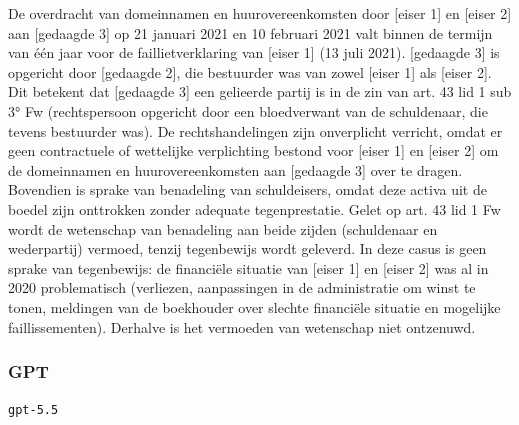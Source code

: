 \documentclass[
  dutch,
  a4paper,
]{article}
\begin{document}
De overdracht van domeinnamen en huurovereenkomsten door {[}eiser 1{]} en {[}eiser 2{]} aan {[}gedaagde 3{]} op 21 januari 2021 en 10 februari 2021 valt binnen de termijn van één jaar voor de faillietverklaring van {[}eiser 1{]} (13 juli 2021). {[}gedaagde 3{]} is opgericht door {[}gedaagde 2{]}, die bestuurder was van zowel {[}eiser 1{]} als {[}eiser 2{]}. Dit betekent dat {[}gedaagde 3{]} een gelieerde partij is in de zin van art. 43 lid 1 sub 3° Fw (rechtspersoon opgericht door een bloedverwant van de schuldenaar, die tevens bestuurder was). De rechtshandelingen zijn onverplicht verricht, omdat er geen contractuele of wettelijke verplichting bestond voor {[}eiser 1{]} en {[}eiser 2{]} om de domeinnamen en huurovereenkomsten aan {[}gedaagde 3{]} over te dragen. Bovendien is sprake van benadeling van schuldeisers, omdat deze activa uit de boedel zijn onttrokken zonder adequate tegenprestatie. Gelet op art. 43 lid 1 Fw wordt de wetenschap van benadeling aan beide zijden (schuldenaar en wederpartij) vermoed, tenzij tegenbewijs wordt geleverd. In deze casus is geen sprake van tegenbewijs: de financiële situatie van {[}eiser 1{]} en {[}eiser 2{]} was al in 2020 problematisch (verliezen, aanpassingen in de administratie om winst te tonen, meldingen van de boekhouder over slechte financiële situatie en mogelijke faillissementen). Derhalve is het vermoeden van wetenschap niet ontzenuwd.

\newpage


\subsubsection{GPT}\label{gpt-8}

\texttt{gpt-5.5}
\end{document}
